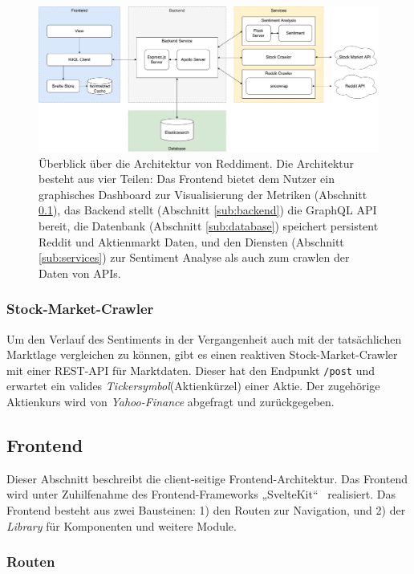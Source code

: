 \documentclass[a4paper, 10pt, conference]{IEEEtran}
\begin{document}
\begin{figure}[ht]
	\centering
	\includegraphics[width=\linewidth]{architecture}
	\caption{Überblick über die Architektur von Reddiment. Die Architektur besteht aus vier Teilen: Das Frontend bietet dem Nutzer ein graphisches Dashboard zur Visualisierung der Metriken (Abschnitt \ref{sub:frontend}),  das Backend stellt (Abschnitt \ref{sub:backend}) die GraphQL API bereit,  die Datenbank (Abschnitt \ref{sub:database}) speichert persistent Reddit und Aktienmarkt Daten,  und den Diensten (Abschnitt \ref{sub:services}) zur Sentiment Analyse als auch zum crawlen der Daten von APIs.}
	\label{fig:architecture}
\end{figure}

\subsubsection{Stock-Market-Crawler}

Um den Verlauf des Sentiments in der Vergangenheit auch mit der tatsächlichen Marktlage vergleichen zu können,
gibt es einen reaktiven Stock-Market-Crawler mit einer REST-API für Marktdaten. Dieser hat den Endpunkt \texttt{/post} und erwartet ein valides \textit{Tickersymbol}(Aktienkürzel) einer Aktie. Der zugehörige Aktienkurs wird von \textit{Yahoo-Finance} abgefragt und zurückgegeben.

\subsection{Frontend} \label{sub:frontend}
Dieser Abschnitt beschreibt die client-seitige Frontend-Architektur. Das Frontend wird unter Zuhilfenahme des Frontend-Frameworks „SvelteKit“~\cite{sveltekit} realisiert. Das Frontend besteht aus zwei Bausteinen: 1) den Routen zur Navigation, und 2) der \textit{Library} für Komponenten und weitere Module.

\subsubsection{Routen}
\end{document}
